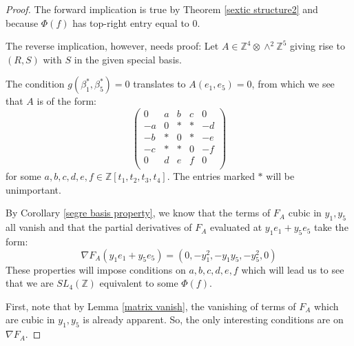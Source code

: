\documentclass{report}
\begin{document}
\begin{proof}

The forward implication is true by Theorem \ref{sextic structure2} and because $\Phi(f)$ has top-right entry equal to 0.

The reverse implication, however, needs proof:  Let $A \in \mathbb{Z}^4 \otimes \wedge^2 \mathbb{Z}^5$ giving rise to $(R,S)$ with $S$ in the given special basis.

The condition $g(\beta_1^*, \beta_5^*) = 0$ translates to $A(e_1,e_5) = 0$, from which we see that $A$ is of the form:
\begin{equation}
\begin{pmatrix}
0 & a & b & c & 0 \\
- a & 0 & * & * & - d \\
- b & * & 0 & * & - e \\
- c & * & * & 0 & - f \\
0 & d & e & f & 0 \\
\end{pmatrix}
\end{equation}
for some $a,b,c,d,e,f \in \mathbb{Z}[t_1,t_2,t_3,t_4]$.  The entries marked $*$ will be unimportant.

By Corollary \ref{segre basis property}, we know that the terms of $F_A$ cubic in $y_1, y_5$ all vanish and that the partial derivatives of $F_A$ evaluated at $y_1 e_1 + y_5 e_5$ take the form:
\begin{equation}
\nabla F_A (y_1 e_1 + y_5 e_5) = (0, - y_1^2, - y_1 y_5, - y_5^2, 0)
\end{equation}
These properties will impose conditions on $a,b,c,d,e,f$ which will lead us to see that we are $SL_4(\mathbb{Z})$ equivalent to some $\Phi(f)$.

First, note that by Lemma \ref{matrix vanish}, the vanishing of terms of $F_A$ which are cubic in $y_1, y_5$ is already apparent.  So, the only interesting conditions are on $\nabla F_A$.


\end{proof}
\end{document}
